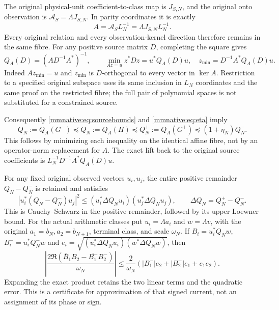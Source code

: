 The original physical-unit coefficient-to-class map is $J_{S,N}$,
and the original onto observation is $\mathcal A_S=\Lambda J_{S,N}$.
In parity coordinates it is exactly
\begin{equation}\label{mmnative:eq:A}
 A=\mathcal A_SL_N^{-1}=\Lambda J_{S,N}L_N^{-1}.
\end{equation}
Every original relation and every observation-kernel direction
therefore remains in the same fibre.  For any positive source matrix
$D$, completing the square gives
\begin{equation}\label{mmnative:eq:minimum}
 Q_A(D)=(AD^{-1}A^*)^{-1},\qquad
 \min_{Az=u}z^*Dz=u^*Q_A(D)u,\quad
 z_{\min}=D^{-1}A^*Q_A(D)u.
\end{equation}
Indeed $Az_{\min}=u$ and $z_{\min}$ is $D$-orthogonal to every
vector in $\ker A$.  Restriction to a specified original subspace
uses its same inclusion in $L_N$ coordinates and the same proof on
the restricted fibre; the full pair of polynomial spaces is not
substituted for a constrained source.

Consequently \eqref{mmnative:eq:sourcebounds} and \eqref{mmnative:eq:eta} imply
\begin{equation}\label{mmnative:eq:Qbounds}
 \boxed{Q_N^-:=Q_A(G^-)\preceq Q_N:=Q_A(H)
 \preceq Q_N^+:=Q_A(G^+)\preceq(1+\eta_N)Q_N^-.}
\end{equation}
This follows by minimizing each inequality on the identical affine
fibre, not by an operator-norm replacement for $A$.  The exact lift
back to the original source coefficients is
$L_N^{-1}D^{-1}A^*Q_A(D)u$.

For any fixed original observed vectors $u_i,u_j$, the entire
positive remainder $Q_N-Q_N^-$ is retained and satisfies
\begin{equation}\label{mmnative:eq:crosserror}
 |u_i^*(Q_N-Q_N^-)u_j|^2
 \le (u_i^*\Delta Q_Nu_i)(u_j^*\Delta Q_Nu_j),\qquad
 \Delta Q_N=Q_N^+-Q_N^-.
\end{equation}
This is Cauchy--Schwarz in the positive remainder, followed by its
upper Loewner bound.  For the actual arithmetic classes put
$u_i=\Lambda a_i$ and $w=\Lambda v$, with the original
$a_1=b_N,a_2=b_{N+1}$, terminal class, and scale $\omega_N$.
If $B_i=u_i^*Q_Nw$, $B_i^-=u_i^*Q_N^-w$ and
$e_i=\sqrt{(u_i^*\Delta Q_Nu_i)(w^*\Delta Q_Nw)}$, then
\begin{equation}\label{mmnative:eq:signedcurrent}
 \left|\frac{2\Re(\bar B_1B_2-\overline{B_1^-}B_2^-)}{\omega_N}\right|
 \le\frac2{\omega_N}
 (|B_1^-|e_2+|B_2^-|e_1+e_1e_2).
\end{equation}
Expanding the exact product retains the two linear terms and the
quadratic error.  This is a certificate for approximation of that
signed current, not an assignment of its phase or sign.

